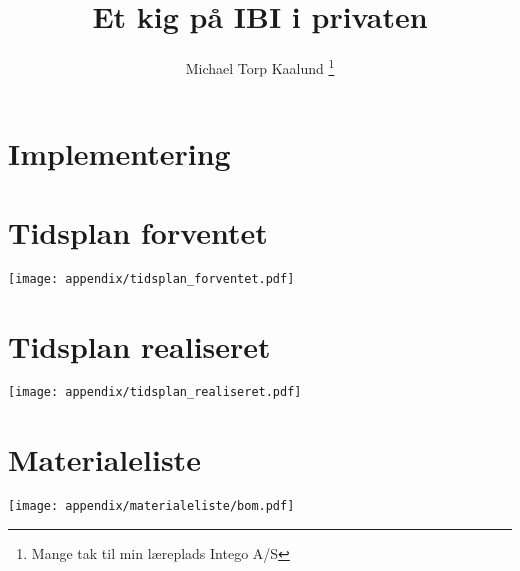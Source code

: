 \documentclass[12pt,a4paper,twoside]{article}
\title{Et kig på IBI i privaten}
\author{Michael Torp Kaalund \thanks{Mange tak til min læreplads Intego A/S}}
\begin{document}
  
    


    \tableofcontents

    \newpage
       

    \section{Implementering}
        
        
        

 
    

    \appendix

    \section{Tidsplan forventet} \label{sec:tidsplan_forventet}
    \texttt{[image: appendix/tidsplan\_forventet.pdf]}
    \section{Tidsplan realiseret} \label{sec:tidsplan_realiseret}
    \texttt{[image: appendix/tidsplan\_realiseret.pdf]}
    \section{Materialeliste}
    \texttt{[image: appendix/materialeliste/bom.pdf]}
    
    
    
    
    
\end{document}
